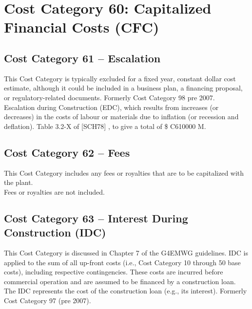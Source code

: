 
\section{Cost Category 60: Capitalized Financial Costs (CFC)}

\subsection*{Cost Category 61 – Escalation}
This Cost Category is typically excluded for a fixed year, constant dollar cost estimate, although it could be included in a business plan, a financing proposal, or regulatory-related documents.  Formerly Cost Category 98 pre 2007.\\

Escalation during Construction (EDC), which results from increases (or decreases) in the costs of labour
or materials due to inflation (or recession and deflation). Table 3.2-X of
[SCH78] %
, to give a total of \$ C610000 M.

\subsection*{Cost Category 62 – Fees}
This Cost Category includes any fees or royalties that are to be capitalized with the plant.\\

Fees or royalties are not included.

\subsection*{Cost Category 63 – Interest During Construction (IDC)}
This Cost Category is discussed in Chapter 7 of the G4EMWG guidelines. IDC is applied to the sum of all up-front costs (i.e., Cost Category 10 through 50 base costs), including respective contingencies. These costs are incurred before commercial operation and are assumed to be financed by a construction loan. The IDC represents the cost of the construction loan (e.g., its interest). Formerly Cost Category 97 (pre 2007).\\

